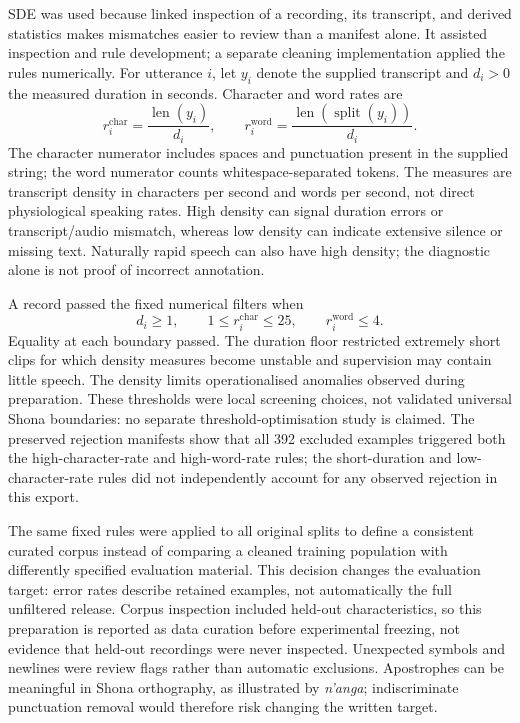 \documentclass[12pt,a4paper]{report}
\begin{document}
SDE was used because linked inspection of a recording, its transcript, and derived statistics makes mismatches easier to review than a manifest alone. It assisted inspection and rule development; a separate cleaning implementation applied the rules numerically. For utterance $i$, let $y_i$ denote the supplied transcript and $d_i>0$ the measured duration in seconds. Character and word rates are
\begin{equation}
r_i^{\mathrm{char}}=\frac{\operatorname{len}(y_i)}{d_i},\qquad
r_i^{\mathrm{word}}=\frac{\operatorname{len}(\operatorname{split}(y_i))}{d_i}.
\end{equation}
The character numerator includes spaces and punctuation present in the supplied string; the word numerator counts whitespace-separated tokens. The measures are transcript density in characters per second and words per second, not direct physiological speaking rates. High density can signal duration errors or transcript/audio mismatch, whereas low density can indicate extensive silence or missing text. Naturally rapid speech can also have high density; the diagnostic alone is not proof of incorrect annotation.

A record passed the fixed numerical filters when
\begin{equation}
d_i\geq1,\qquad 1\leq r_i^{\mathrm{char}}\leq25,\qquad r_i^{\mathrm{word}}\leq4.
\end{equation}
Equality at each boundary passed. The duration floor restricted extremely short clips for which density measures become unstable and supervision may contain little speech. The density limits operationalised anomalies observed during preparation. These thresholds were local screening choices, not validated universal Shona boundaries: no separate threshold-optimisation study is claimed. The preserved rejection manifests show that all 392 excluded examples triggered both the high-character-rate and high-word-rate rules; the short-duration and low-character-rate rules did not independently account for any observed rejection in this export.

The same fixed rules were applied to all original splits to define a consistent curated corpus instead of comparing a cleaned training population with differently specified evaluation material. This decision changes the evaluation target: error rates describe retained examples, not automatically the full unfiltered release. Corpus inspection included held-out characteristics, so this preparation is reported as data curation before experimental freezing, not evidence that held-out recordings were never inspected. Unexpected symbols and newlines were review flags rather than automatic exclusions. Apostrophes can be meaningful in Shona orthography, as illustrated by \emph{n'anga}; indiscriminate punctuation removal would therefore risk changing the written target.
\end{document}

